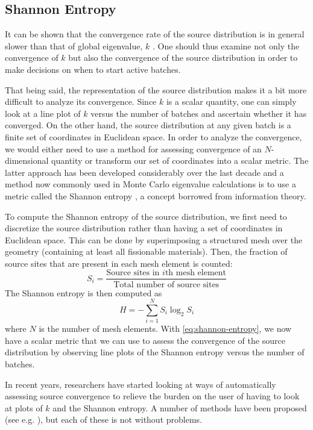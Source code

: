 \subsection{Shannon Entropy}
\label{sec:shannon-entropy}

It can be shown that the convergence rate of the source distribution is in
general slower than that of global eigenvalue, $k$ \cite{lanl-brown-2005}. One
should thus examine not only the convergence of $k$ but also the convergence of
the source distribution in order to make decisions on when to start active
batches.

That being said, the representation of the source distribution makes it a bit
more difficult to analyze its convergence. Since $k$ is a scalar quantity, one
can simply look at a line plot of $k$ versus the number of batches and ascertain
whether it has converged. On the other hand, the source distribution at any
given batch is a finite set of coordinates in Euclidean space. In order to
analyze the convergence, we would either need to use a method for assessing
convergence of an $N$-dimensional quantity or transform our set of coordinates
into a scalar metric. The latter approach has been developed considerably over
the last decade and a method now commonly used in Monte Carlo eigenvalue
calculations is to use a metric called the Shannon entropy
\cite{physor-brown-2006}, a concept borrowed from information theory.

To compute the Shannon entropy of the source distribution, we first need to
discretize the source distribution rather than having a set of coordinates in
Euclidean space. This can be done by superimposing a structured mesh over the
geometry (containing at least all fissionable materials). Then, the fraction of
source sites that are present in each mesh element is counted:
\begin{equation}
  \label{eq:fraction-source}
  S_i = \frac{\text{Source sites in $i$th mesh element}}{\text{Total number of
      source sites}}
\end{equation}
The Shannon entropy is then computed as
\begin{equation}
  \label{eq:shannon-entropy}
  H = - \sum_{i=1}^N S_i \log_2 S_i
\end{equation}
where $N$ is the number of mesh elements. With \eqref{eq:shannon-entropy}, we
now have a scalar metric that we can use to assess the convergence of the source
distribution by observing line plots of the Shannon entropy versus the number of
batches.

In recent years, researchers have started looking at ways of automatically
assessing source convergence to relieve the burden on the user of having to look
at plots of $k$ and the Shannon entropy. A number of methods have been proposed
(see e.g. \cite{mc-romano-2009, trans-ueki-2008}), but each of these is not
without problems.
